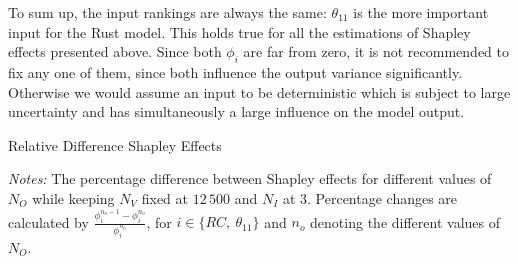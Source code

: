 
To sum up, the input rankings are always the same: $\theta_{11}$ is the more important input for the Rust model. This holds true for all the estimations of Shapley effects presented above. Since both $\phi_i$ are far from zero, it is not recommended to fix any one of them, since both influence the output variance significantly. Otherwise we would assume an input to be deterministic which is subject to large uncertainty and has simultaneously a large influence on the model output.

\begin{table}[t]
	\centering
	\caption{Relative Difference Shapley Effects}
	\label{rel_diff_shapley}
	\begin{threeparttable}
	\centering
	
	\begin{tablenotes}
	\small
	\item \textit{Notes:} The percentage difference between Shapley effects for different values of $N_O$ while keeping $N_V$ fixed at $12\,500$ and $N_I$ at $3$. Percentage changes are calculated by $\frac{\phi_i^{n_o-1} - \phi_i^{n_o}}{\phi_i^{n_o}}$, for $i \in \{RC,\ \theta_{11}\}$ and $n_o$ denoting the different values of $N_O$.
	\end{tablenotes}
	\end{threeparttable}
\end{table}